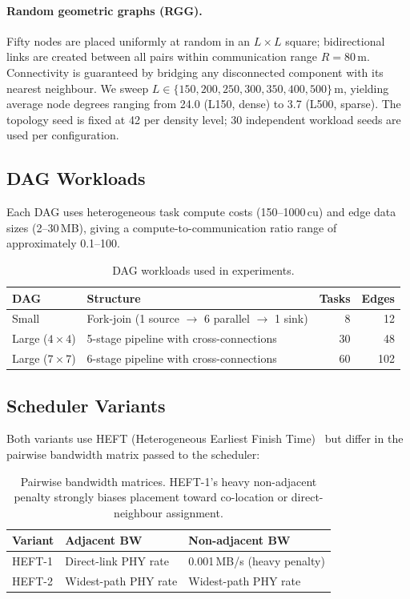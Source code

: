 \documentclass[11pt]{article}
\begin{document}
\paragraph{Random geometric graphs (RGG).}
Fifty nodes are placed uniformly at random in an $L \times L$ square; bidirectional
links are created between all pairs within communication range $R = 80$\,m.
Connectivity is guaranteed by bridging any disconnected component with its nearest
neighbour.  We sweep $L \in \{150, 200, 250, 300, 350, 400, 500\}$\,m,
yielding average node degrees ranging from 24.0 (L150, dense) to 3.7 (L500,
sparse).  The topology seed is fixed at 42 per density level; 30 independent
workload seeds are used per configuration.

\subsection{DAG Workloads}

Each DAG uses heterogeneous task compute costs (150--1000\,cu) and edge data
sizes (2--30\,MB), giving a compute-to-communication ratio range of approximately
0.1--100.

\begin{table}[H]
\centering
\small
\begin{tabular}{llrr}
\toprule
\textbf{DAG} & \textbf{Structure} & \textbf{Tasks} & \textbf{Edges} \\
\midrule
Small    & Fork-join (1 source $\to$ 6 parallel $\to$ 1 sink) & 8  & 12  \\
Large ($4\times4$) & 5-stage pipeline with cross-connections     & 30 & 48  \\
Large ($7\times7$) & 6-stage pipeline with cross-connections     & 60 & 102 \\
\bottomrule
\end{tabular}
\caption{DAG workloads used in experiments.}
\label{tab:dags}
\end{table}

\subsection{Scheduler Variants}
\label{sec:schedulers}

Both variants use HEFT (Heterogeneous Earliest Finish Time)~\cite{heft} but
differ in the pairwise bandwidth matrix passed to the scheduler:

\begin{table}[H]
\centering
\small
\begin{tabular}{lll}
\toprule
\textbf{Variant} & \textbf{Adjacent BW} & \textbf{Non-adjacent BW} \\
\midrule
HEFT-1 & Direct-link PHY rate & 0.001\,MB/s (heavy penalty) \\
HEFT-2 & Widest-path PHY rate & Widest-path PHY rate \\
\bottomrule
\end{tabular}
\caption{Pairwise bandwidth matrices.  HEFT-1's heavy non-adjacent penalty
strongly biases placement toward co-location or direct-neighbour assignment.}
\label{tab:schedulers}
\end{table}
\end{document}
